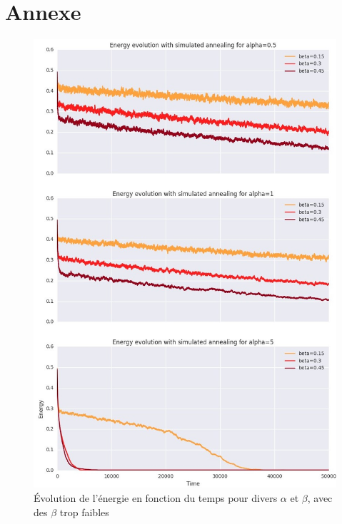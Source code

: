 \documentclass[twocolumn]{article}
\begin{document}
\section{Annexe}
\begin{figure}[h]
	\includegraphics[width=\columnwidth]{../tobekept/skype_1.jpg}
	\caption{Évolution de l'énergie en fonction du temps pour divers $\alpha$ et $\beta$, avec des $\beta$ trop faibles}
\end{figure}
\end{document}
